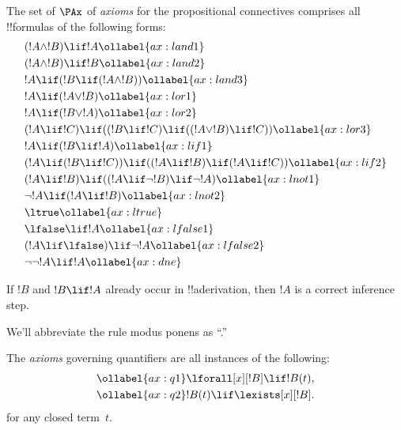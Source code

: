 

\begin{defn}[Axioms]
The set of $\PAx$ of \emph{axioms} for the propositional connectives comprises
all !!{formula}s of the following forms:
\begin{align}
  & (!A \land !B) \lif !A \ollabel{ax:land1}\\
  & (!A \land !B) \lif !B \ollabel{ax:land2}\\
  & !A \lif (!B \lif (!A \land !B)) \ollabel{ax:land3}\\
  & !A \lif (!A \lor !B) \ollabel{ax:lor1}\\
  & !A \lif (!B \lor !A) \ollabel{ax:lor2}\\
  & (!A \lif !C) \lif ((!B \lif !C) \lif ((!A \lor !B) \lif !C)) \ollabel{ax:lor3}\\
  & !A \lif (!B \lif !A) \ollabel{ax:lif1}\\
  & (!A \lif (!B \lif !C)) \lif ((!A \lif !B) \lif (!A \lif !C)) \ollabel{ax:lif2}\\
  & (!A \lif !B) \lif ((!A \lif \lnot !B) \lif \lnot !A) \ollabel{ax:lnot1}\\
  & \lnot !A \lif (!A \lif !B) \ollabel{ax:lnot2}\\
  & \ltrue \ollabel{ax:ltrue}\\
  & \lfalse \lif !A \ollabel{ax:lfalse1}\\
  & (!A \lif \lfalse) \lif \lnot !A \ollabel{ax:lfalse2}\\
  & \lnot\lnot !A \lif !A \ollabel{ax:dne}
\end{align}
\end{defn}

\begin{defn}
  If $!B$ and $!B \lif !A$ already occur in !!a{derivation}, then $!A$ is
  a correct inference step.
\end{defn}

We'll abbreviate the rule modus ponens as ``\MP.''




  



\begin{defn}
The \emph{axioms} governing quantifiers are
all instances of the following:
\begin{align}
\ollabel{ax:q1} & \lforall[x][!B] \lif !B(t), \\
\ollabel{ax:q2} & !B(t) \lif \lexists[x][!B].
\end{align}
for any closed term~$t$.
\end{defn}

